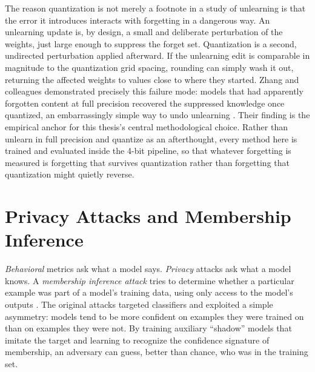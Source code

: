 \documentclass[a4paper,12pt]{report}
\begin{document}
The reason quantization is not merely a footnote in a study of unlearning is that the error it introduces interacts with forgetting in a dangerous way. An unlearning update is, by design, a small and deliberate perturbation of the weights, just large enough to suppress the forget set. Quantization is a second, undirected perturbation applied afterward. If the unlearning edit is comparable in magnitude to the quantization grid spacing, rounding can simply wash it out, returning the affected weights to values close to where they started. Zhang and colleagues demonstrated precisely this failure mode: models that had apparently forgotten content at full precision recovered the suppressed knowledge once quantized, an embarrassingly simple way to undo unlearning \parencite{zhang2024quantization}. Their finding is the empirical anchor for this thesis's central methodological choice. Rather than unlearn in full precision and quantize as an afterthought, every method here is trained and evaluated inside the 4-bit pipeline, so that whatever forgetting is measured is forgetting that survives quantization rather than forgetting that quantization might quietly reverse.

\section{Privacy Attacks and Membership Inference}
\label{sec:bg-mia}
\emph{Behavioral} metrics ask what a model says. \emph{Privacy} attacks ask what a model knows. A \emph{membership inference attack} tries to determine whether a particular example was part of a model's training data, using only access to the model's outputs \parencite{shokri2017mia}. The original attacks targeted classifiers and exploited a simple asymmetry: models tend to be more confident on examples they were trained on than on examples they were not. By training auxiliary ``shadow'' models that imitate the target and learning to recognize the confidence signature of membership, an adversary can guess, better than chance, who was in the training set.
\end{document}

